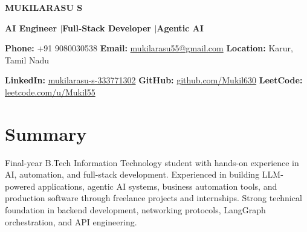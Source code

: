 \documentclass[10pt,a4paper]{article}
\begin{document}
\color{darktext}

\begin{center}

    {\LARGE\bfseries MUKILARASU S}

    \vspace{3pt}

    {\normalsize\color{accent}\textbf{
    AI Engineer \enspace$\vert$\enspace Full-Stack Developer \enspace$\vert$\enspace Agentic AI
    }}

    \vspace{5pt}

    {\small\color{graytext}
    \textbf{Phone:} +91 9080030538
    \quad
    \textbf{Email:} \href{mailto:mukilarasu55@gmail.com}{mukilarasu55@gmail.com}
    \quad
    \textbf{Location:} Karur, Tamil Nadu
    }

    \vspace{3pt}

    {\small\color{graytext}
    \textbf{LinkedIn:} \href{https://linkedin.com/in/mukilarasu-s-333771302}{mukilarasu-s-333771302}
    \quad
    \textbf{GitHub:} \href{https://github.com/Mukil630}{github.com/Mukil630}
    \quad
    \textbf{LeetCode:} \href{https://leetcode.com/u/Mukil55}{leetcode.com/u/Mukil55}
    }

\end{center}

\vspace{-4pt}

\section{Summary}

{\small\color{graytext}
Final-year B.Tech Information Technology student with hands-on experience in AI, automation, and full-stack development. Experienced in building LLM-powered applications, agentic AI systems, business automation tools, and production software through freelance projects and internships. Strong technical foundation in backend development, networking protocols, LangGraph orchestration, and API engineering.
}

\end{document}
